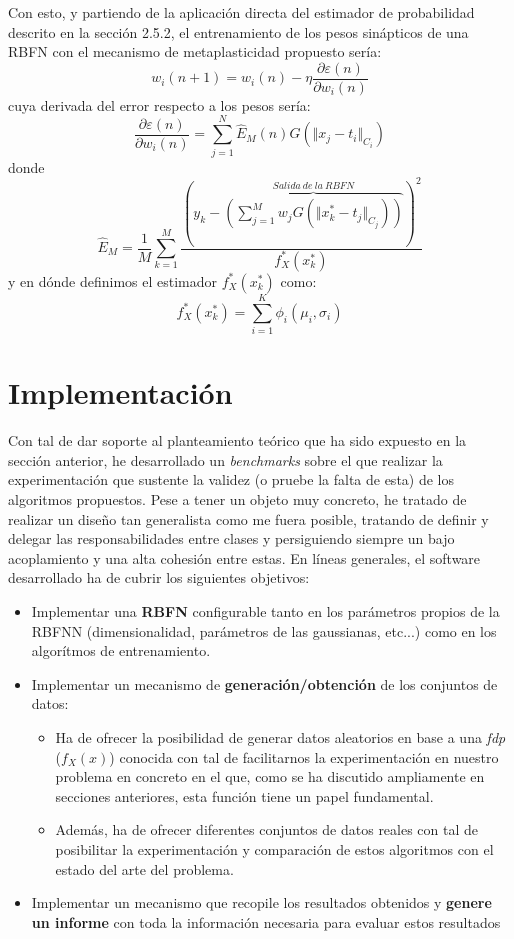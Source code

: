 \documentclass[10pt,a4paper]{report}
\begin{document}
Con esto, y partiendo de la aplicación directa del estimador de probabilidad descrito en la sección 2.5.2, el entrenamiento de los pesos sinápticos de una RBFN con el mecanismo de metaplasticidad propuesto sería:
\begin{equation}
	w_i(n+1)=w_i(n) - \eta \dfrac{\partial\varepsilon(n)}{\partial w_i(n)}
\end{equation} 
cuya derivada del error respecto a los pesos sería:
\begin{equation}
	\dfrac{\partial\varepsilon(n)}{\partial w_i(n)} = \sum^N_{j=1}{\widehat{E}_M(n) G(\Vert x_j - t_i \Vert_{C_i})}
\end{equation}
donde
\begin{equation}
	\widehat{E}_M=\dfrac{1}{M}\sum^M_{k=1}\dfrac{(y_k - \overbrace{\left(\sum^M_{j=1}{w_j G(\Vert x^*_k - t_j \Vert_{C_j})}\right)}^{Salida\ de\ la\ RBFN})^2}{f^*_X(x^*_k)}
\end{equation}
y en dónde definimos el estimador $f^*_X(x^*_k)$ como:
\begin{equation}
	f^*_X(x^*_k) = \sum^K_{i=1}\phi_i(\mu_i,\sigma_i)
\end{equation}


\chapter{Implementación}
Con tal de dar soporte al planteamiento teórico que ha sido expuesto en la sección anterior, he desarrollado un \textit{benchmarks} sobre el que realizar la experimentación que sustente la validez (o pruebe la falta de esta) de los algoritmos propuestos. Pese a tener un objeto muy concreto, he tratado de realizar un diseño tan generalista como me fuera posible, tratando de definir y delegar las responsabilidades entre clases y persiguiendo siempre un bajo acoplamiento y una alta cohesión entre estas.
En líneas generales, el software desarrollado ha de cubrir los siguientes objetivos:
\begin{itemize}
	\item Implementar una \textbf{RBFN} configurable tanto en los parámetros propios de la RBFNN (dimensionalidad, parámetros de las gaussianas, etc...) como en los algorítmos de entrenamiento.
	\item Implementar un mecanismo de \textbf{generación/obtención} de los conjuntos de datos:
	\begin{itemize}
		\item Ha de ofrecer la posibilidad de generar datos aleatorios en base a una \textit{fdp} ($f_X(x)$) conocida con tal de facilitarnos la experimentación en nuestro problema en concreto en el que, como se ha discutido ampliamente en secciones anteriores, esta función tiene un papel fundamental.
		\item Además, ha de ofrecer diferentes conjuntos de datos reales con tal de posibilitar la experimentación y comparación de estos algoritmos con el estado del arte del problema.
	\end{itemize}
	\item Implementar un mecanismo que recopile los resultados obtenidos y \textbf{genere un informe} con toda la información necesaria para evaluar estos resultados
\end{itemize}
\end{document}
